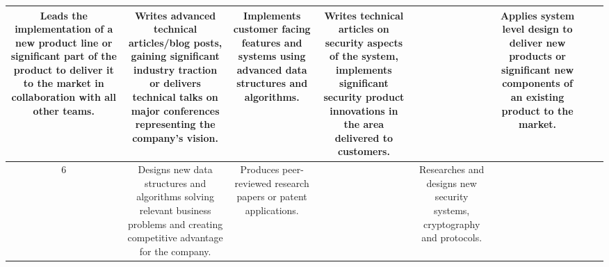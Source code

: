 \documentclass{article}
\begin{document}
{\begin{tabular}{|C|C|C|C|C|C|C|C|}
    Leads the implementation of a new product line or significant part of the
    product to deliver it to the market in collaboration with all other teams.
    &

    Writes advanced technical articles/blog posts, gaining significant industry
    traction or delivers technical talks on major conferences representing the
    company's vision.
    &

    Implements customer facing features and systems using advanced data
    structures and algorithms.
    &

    Writes technical articles on security aspects of the system, implements
    significant security product innovations in the area delivered to customers.
    &

    &

    Applies system level design to deliver new products or significant new
    components of an existing product to the market.
    &

    \\ [13em]
  \hline
    6
    &

    Designs new data structures and algorithms solving relevant business
    problems and creating competitive advantage for the company.
    &

    Produces peer-reviewed research papers or patent applications.
    &

    &

    Researches and designs new security systems, cryptography and protocols.
    &

    &

    &

    \\ [12em]
\end{tabular}

}
\end{document}
